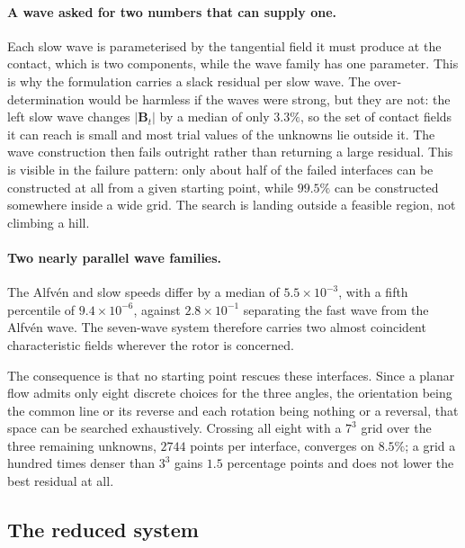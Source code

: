\paragraph{A wave asked for two numbers that can supply one.}
Each slow wave is parameterised by the tangential field it must produce at the
contact, which is two components, while the wave family has one parameter.
This is why the formulation carries a slack residual per slow wave. The
over-determination would be harmless if the waves were strong, but they are
not: the left slow wave changes $\lvert\mathbf{B}_t\rvert$ by a median of only
$3.3\%$, so the set of contact fields it can reach is small and most trial
values of the unknowns lie outside it. The wave construction then fails
outright rather than returning a large residual. This is visible in the
failure pattern: only about half of the failed interfaces can be constructed
at all from a given starting point, while $99.5\%$ can be constructed
somewhere inside a wide grid. The search is landing outside a feasible
region, not climbing a hill.

\paragraph{Two nearly parallel wave families.}
The Alfv\'en and slow speeds differ by a median of $5.5 \times 10^{-3}$, with
a fifth percentile of $9.4 \times 10^{-6}$, against $2.8 \times 10^{-1}$
separating the fast wave from the Alfv\'en wave. The seven-wave system therefore
carries two almost coincident characteristic fields wherever the rotor is
concerned.

The consequence is that no starting point rescues these interfaces. Since a
planar flow admits only eight discrete choices for the three angles, the
orientation being the common line or its reverse and each rotation being
nothing or a reversal, that space can be searched exhaustively. Crossing all
eight with a $7^3$ grid over the three remaining unknowns, $2744$ points per
interface, converges on $8.5\%$; a grid a hundred times denser than $3^3$
gains $1.5$ percentage points and does not lower the best residual at all.

\subsection{The reduced system}
\label{sec:planar:system}

